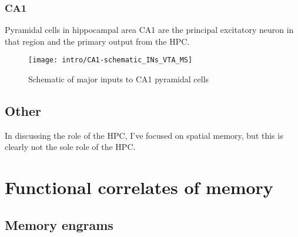 \subsubsection{CA1}
Pyramidal cells in hippocampal area CA1 are the principal excitatory neuron in that region and the primary output from the \ac{HPC}.
\begin{figure}
	\centering
	\texttt{[image: intro/CA1-schematic\_INs\_VTA\_MS]}
	\caption{Schematic of major inputs to CA1 pyramidal cells}
	\label{fig:intro:memory:CA1_schematic}
\end{figure}


\subsection{Other}
In discussing the role of the \ac{HPC}, I've focused on spatial memory, but this is clearly not the sole role of the \ac{HPC}.

\section{Functional correlates of memory}\label{sec:intro:memory:physiology}

\subsection{Memory engrams}

